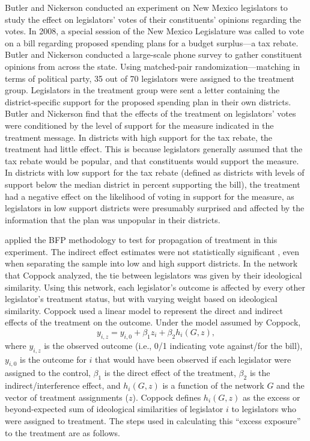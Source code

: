 \documentclass[12pt]{article}
\begin{document}
Butler and Nickerson conducted an experiment on New Mexico legislators to study the effect on legislators' votes of their constituents' opinions regarding the votes. In 2008, a special session of the New Mexico Legislature was called to vote on a bill regarding proposed spending plans for a budget surplus---a tax rebate. Butler and Nickerson conducted a large-scale phone survey to gather constituent opinions from across the state. Using matched-pair randomization---matching in terms of political party, 35 out of 70 legislators were assigned to the treatment group. Legislators in the treatment group were sent a letter containing the district-specific support for the proposed spending plan in their own districts. Butler and Nickerson find that the effects of the treatment on legislators' votes were conditioned by the level of support for the measure indicated in the treatment message. In districts with high support for the tax rebate, the treatment had little effect. This is because legislators generally assumed that the tax rebate would be popular, and that constituents would support the measure. In districts with low support for the tax rebate (defined as districts with levels of support below the median district in percent supporting the bill), the treatment had a negative effect on the likelihood of voting in support for the measure, as legislators in low support districts were presumably surprised and affected by the information that the plan was unpopular in their districts.

\citet{coppock2014information} applied the BFP methodology to test for propagation of treatment in this experiment. The indirect effect estimates were not statistically significant \citep{coppock2016information}, even when separating the sample into low and high support districts. In the network that Coppock analyzed, the tie between legislators was given by their ideological similarity.  Using this network, each legislator's outcome is affected by every other legislator's treatment status, but with varying weight based on ideological similarity. Coppock used a linear model to represent the direct and indirect effects of the treatment on the outcome. Under the model assumed by Coppock, $$y_{i,z} = y_{i,0}+\beta_1z_i+\beta_2h_i(G,z),$$ where $y_{i,z}$ is the observed outcome (i.e., 0/1 indicating vote against/for the bill), $y_{i,0}$ is the outcome for $i$ that would have been observed if each legislator were assigned to the control, $\beta_1$ is the direct effect of the treatment, $\beta_2$ is the indirect/interference effect, and $h_i(G,z)$ is a function of the network $G$ and the vector of treatment assignments ($z$). Coppock defines $h_i(G,z)$ as the excess or beyond-expected sum of ideological similarities of legislator $i$ to legislators who were assigned to treatment. The steps used in calculating this ``excess exposure'' to the treatment are as follows.
\end{document}
